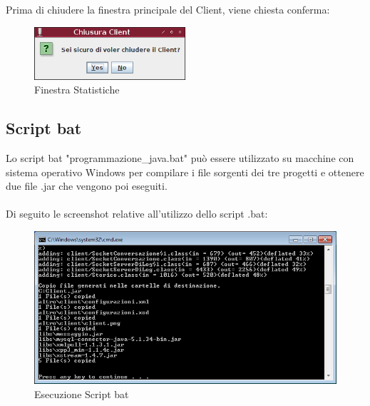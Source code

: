 \documentclass[a4paper, 11pt]{article} %
\begin{document}
Prima di chiudere la finestra principale del Client, viene chiesta conferma:
\begin{figure}[H]
\includegraphics[width=0.5\textwidth]{images/client-16.png}
\vspace{-0.2cm}
\caption{Finestra Statistiche}
\end{figure}

\subsection{Script bat}
Lo script bat "programmazione\_java.bat" pu\`o essere utilizzato su macchine con sistema operativo Windows per compilare i file sorgenti dei tre progetti e ottenere due file .jar che vengono poi eseguiti.\\
\\
Di seguito le screenshot relative all'utilizzo dello script .bat:\\
\begin{center}
\begin{figure}[H]
\vspace{-0.8cm}
\includegraphics[width=1.0\textwidth]{images/script_bat-1.PNG}
\vspace{-0.7cm}
\caption{Esecuzione Script bat}
\end{figure}
\end{center}
\vspace{-1.4cm}
\end{document}
